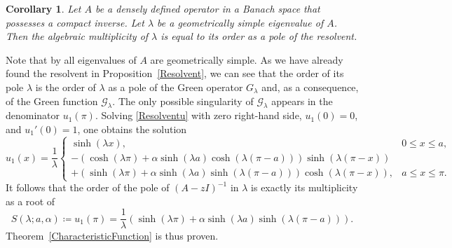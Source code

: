 \documentclass[11pt, a4paper,reqno]{amsart}
\theoremstyle{plain}
\newtheorem{corollary}[theorem]{Corollary}
\theoremstyle{definition}
\theoremstyle{remark}
\newcommand{\dd}{\,\textrm{d}}
\renewcommand{\leq}{\leqslant}	\renewcommand{\geq}{\geqslant}
\newcommand{\1}{\mathds 1}
\newcommand{\Dom}{\mathsf{dom}\,}
\begin{document}
\begin{corollary}
    Let $A$ be a densely defined operator in a Banach space that possesses a compact inverse. Let $\lambda$ be a geometrically simple eigenvalue of $A$. Then the algebraic multiplicity of $\lambda$ is equal to its order as a pole of the resolvent.
\end{corollary}





Note that by \cite{BRT} all eigenvalues of $A$ are geometrically simple. As we have already found the resolvent in Proposition~\ref{Resolvent}, we can see that the order of its pole $\lambda$ is the order of $\lambda$ as a pole of the Green operator $G_\lambda$ and, as a consequence, of the Green function $\mathcal G_\lambda$. The only possible singularity of $\mathcal G_\lambda$ appears in the denominator $u_1(\pi).$ Solving \eqref{Resolventu} with zero right-hand side, $u_1(0) = 0$, and $u_1'(0) = 1$, one obtains the solution
\[
u_1(x) = \frac{1}{\lambda}\begin{cases}
\sinh(\lambda x), & 0 \leq x \leq a,\\
-\left(\cosh(\lambda\pi) +\alpha \sinh(\lambda a)\cosh(\lambda(\pi-a))\right)\sinh(\lambda(\pi-x)) \\+ \left(\sinh(\lambda\pi) + \alpha \sinh(\lambda a)\sinh(\lambda(\pi-a))\right)\cosh(\lambda(\pi-x)), & a \leq x \leq \pi.
\end{cases}
\]
It follows that the order of the pole of $(A-z I)^{-1}$ in $\lambda$ is exactly its multiplicity as a root of
\begin{equation}
S(\lambda; a, \alpha) \coloneqq u_1(\pi) = \frac{1}{\lambda}\left(\sinh(\lambda\pi) + \alpha\sinh(\lambda a) \sinh(\lambda(\pi-a))\right).
\end{equation}
Theorem~\ref{CharacteristicFunction} is thus proven.
\end{document}
